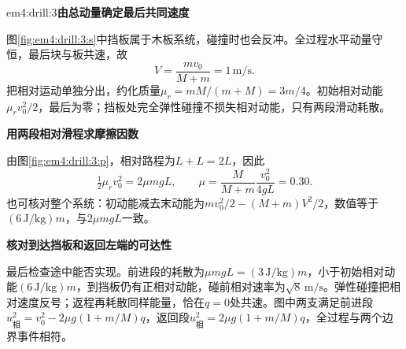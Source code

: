 \begin{drillsolution}{em4:drill:3}\textbf{由总动量确定最后共同速度}\par\nobreak
图\ref{fig:em4:drill:3:s}中挡板属于木板系统，碰撞时也会反冲。全过程水平动量守恒，最后块与板共速，故
\[
 V=\frac{mv_0}{M+m}=\boxed{1\,\mathrm{m/s}}.
\]
把相对运动单独分出，约化质量$\mu_r=mM/(m+M)=3m/4$。初始相对动能$\mu_rv_0^2/2$，最后为零；挡板处完全弹性碰撞不损失相对动能，只有两段滑动耗散。



\par\medskip{}\noindent\textbf{用两段相对滑程求摩擦因数}\par\nobreak
由图\ref{fig:em4:drill:3:p}，相对路程为$L+L=2L$，因此
\[
 \tfrac12\mu_rv_0^2=2\mu mgL,
 \qquad \mu=\frac{M}{M+m}\frac{v_0^2}{4gL}=\boxed{0.30}.
\]
也可核对整个系统：初动能减去末动能为$mv_0^2/2-(M+m)V^2/2$，数值等于$(6\,\mathrm{J/kg})m$，与$2\mu mgL$一致。



\par\medskip{}\noindent\textbf{核对到达挡板和返回左端的可达性}\par\nobreak
最后检查途中能否实现。前进段的耗散为$\mu mgL=(3\,\mathrm{J/kg})m$，小于初始相对动能$(6\,\mathrm{J/kg})m$，到挡板仍有正相对动能，碰前相对速率为$\sqrt8\,\mathrm{m/s}$。弹性碰撞把相对速度反号；返程再耗散同样能量，恰在$q=0$处共速。图中两支满足前进段$u_{\text{相}}^2=v_0^2-2\mu g(1+m/M)q$，返回段$u_{\text{相}}^2=2\mu g(1+m/M)q$，全过程与两个边界事件相符。
\end{drillsolution}
